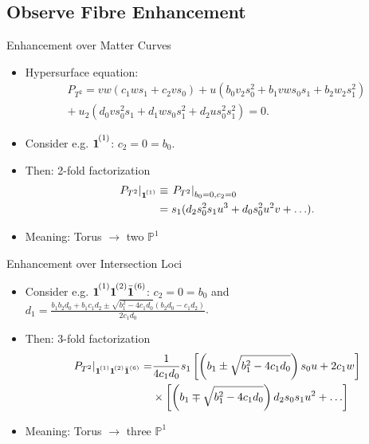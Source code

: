 \documentclass[notes=hide]{beamer}
\newcommand\mc[1]{{\vphantom{\bar{\boldsymbol{1}}}\boldsymbol{1}}^{\mkern-2mu (#1)}}
\newcommand{\mcb}[1]{\bar{\boldsymbol{1}}^{(#1)}}
\newcommand{\yd}{\mc{1}\mc{2}\mcb{6}}
\begin{document}
\subsection{Observe Fibre Enhancement}
\begin{frame}{Enhancement over Matter Curves}
\begin{itemize}[<+->]
\item Hypersurface equation:
\begin{gather*}
P_{T^2} = vw(c_1ws_1+c_2vs_0)+u(b_0v_2s^2_0+b_1vws_0s_1+b_2w_2s^2_1 )  \\
 + \: u_2(d_0vs^2_0s_1 +d_1ws_0s^2_1 +d_2us^2_0s^2_1)=0.
\end{gather*}
\item Consider e.g. $\mc{1}$: $c_2 = 0 = b_0$.
\item Then: 2-fold factorization
\begin{align*}
\left. P_{T^2} \right|_{\mc{1}} &\equiv \left. P_{T^2} \right|_{b_0 =0, c_2=0}  \\
&=  s_1 (d_2 s_0^2 s_1 u^3 + d_0 s_0^2 u^2 v +  \ldots ).
\end{align*}
\item Meaning: Torus $\rightarrow$ two $\mathbb{P}^1$
\end{itemize}
\end{frame}


\begin{frame}{Enhancement over Intersection Loci}
\begin{itemize}[<+->]
\item Consider e.g. $\yd$: $c_2 = 0 = b_0$ and $d_1= \frac{ b_1 b_2 d_0 + b_1 c_1 d_2 \pm \sqrt{b_1^2 - 4 c_1 d_0} (b_2 d_0 - c_1 d_2)}{2 c_1 d_0}$.
\vspace{0.5em}
\item Then: 3-fold factorization
\begin{align*}
\left. P_{T^2} \right|_{\yd} = & \frac{1}{4 c_1 d_0} s_1 \left[ \left( b_1 \pm \sqrt{b_1^2 - 4 c_1 d_0} \right) s_0 u + 2 c_1 w \right]\\
		& \times \left[ \left(b_1 \mp \sqrt{b_1^2 - 4 c_1 d_0} \right) d_2 s_0 s_1 u^2+ \ldots\right]
\end{align*}
\item Meaning: Torus $\rightarrow$ three $\mathbb{P}^1$
\end{itemize}
\end{frame}
\end{document}
